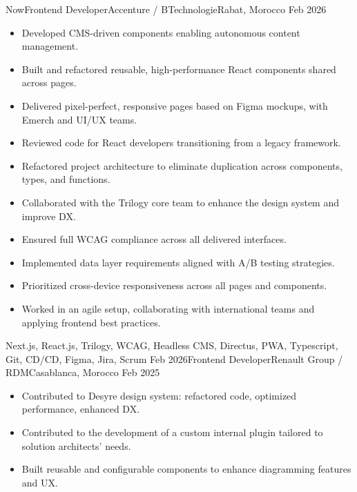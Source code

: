 \begin{experiences}
    \experience
        {Now}{Frontend Developer}{Accenture / BTechnologie}{Rabat, Morocco}
        {Feb 2026}
            {\begin{itemize}
                \item Developed CMS-driven components enabling autonomous content management.
                \item Built and refactored reusable, high-performance React components shared across pages.
                \item Delivered pixel-perfect, responsive pages based on Figma mockups, with Emerch and UI/UX teams.
                \item Reviewed code for React developers transitioning from a legacy framework.
                \item Refactored project architecture to eliminate duplication across components, types, and functions.
                \item Collaborated with the Trilogy core team to enhance the design system and improve DX.
                \item Ensured full WCAG compliance across all delivered interfaces.
                \item Implemented data layer requirements aligned with A/B testing strategies.
                \item Prioritized cross-device responsiveness across all pages and components.
                \item Worked in an agile setup, collaborating with international teams and applying frontend best practices.\\
            \end{itemize}}
            {Next.js, React.js, Trilogy, WCAG, Headless CMS, Directus, PWA, Typescript, Git, CD/CD, Figma, Jira, Scrum}
    \emptySeparator
    \experience
        {Feb 2026}{Frontend Developer}{Renault Group / RDM}{Casablanca, Morocco}
        {Feb 2025}
            {\begin{itemize}
                \item Contributed to Desyre design system: refactored code, optimized performance, enhanced DX.
                \item Contributed to the development of a custom internal plugin tailored to solution architects' needs.
                \item Built reusable and configurable components to enhance diagramming features and UX.

\end{itemize}}
\end{experiences}
